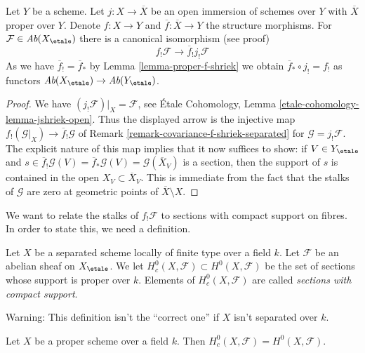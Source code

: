 \begin{lemma}
\label{lemma-compactify-f-shriek-separated}
Let $Y$ be a scheme. Let $j : X \to \overline{X}$ be an open
immersion of schemes over $Y$ with $\overline{X}$ proper over $Y$.
Denote $f : X \to Y$ and $\overline{f} : \overline{X} \to Y$
the structure morphisms. For $\mathcal{F} \in \textit{Ab}(X_\etale)$
there is a canonical isomorphism (see proof)
$$
f_!\mathcal{F} \longrightarrow \overline{f}_!j_!\mathcal{F}
$$
As we have $\overline{f}_! = \overline{f}_*$ by
Lemma \ref{lemma-proper-f-shriek} we obtain
$\overline{f}_* \circ j_! = f_!$ as functors
$\textit{Ab}(X_\etale) \to \textit{Ab}(Y_\etale)$.
\end{lemma}

\begin{proof}
We have $(j_!\mathcal{F})|_X = \mathcal{F}$, see
\'Etale Cohomology, Lemma \ref{etale-cohomology-lemma-jshriek-open}.
Thus the displayed arrow is the injective map
$f_!(\mathcal{G}|_X) \to \overline{f}_!\mathcal{G}$
of Remark \ref{remark-covariance-f-shriek-separated}
for $\mathcal{G} = j_!\mathcal{F}$. The explicit nature
of this map implies that it now suffices to show: if $V \in Y_\etale$ and
$s \in \overline{f}_!\mathcal{G}(V) = \overline{f}_*\mathcal{G}(V) =
\mathcal{G}(\overline{X}_V)$
is a section, then the support of $s$ is contained in the open
$X_V \subset \overline{X}_V$. This is immediate from the fact
that the stalks of $\mathcal{G}$ are zero at geometric
points of $\overline{X} \setminus X$.
\end{proof}

\noindent
We want to relate the stalks of $f_!\mathcal{F}$ to sections with
compact support on fibres. In order to state this, we need a definition.

\begin{definition}
\label{definition-compact-support}
Let $X$ be a separated scheme locally of finite type over a field $k$.
Let $\mathcal{F}$ be an abelian sheaf on $X_\etale$. We let
$H^0_c(X, \mathcal{F}) \subset H^0(X, \mathcal{F})$ be the
set of sections whose support is proper over $k$. Elements of
$H^0_c(X, \mathcal{F})$ are called {\it sections with compact support}.
\end{definition}

\noindent
Warning: This definition isn't the ``correct one'' if $X$ isn't
separated over $k$.

\begin{lemma}
\label{lemma-proper-compact-support}
Let $X$ be a proper scheme over a field $k$. Then
$H^0_c(X, \mathcal{F}) = H^0(X, \mathcal{F})$.
\end{lemma}

